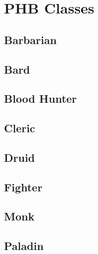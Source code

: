 \documentclass[./main.tex]{subfiles}
\begin{document}
\chapter{PHB Classes}
\section{Barbarian}


\clearpage

\section{Bard}


\clearpage

\section{Blood Hunter}


\clearpage

\section{Cleric}


\clearpage

\section{Druid}


\clearpage

\section{Fighter}


\clearpage

\section{Monk}


\clearpage

\section{Paladin}

\end{document}
